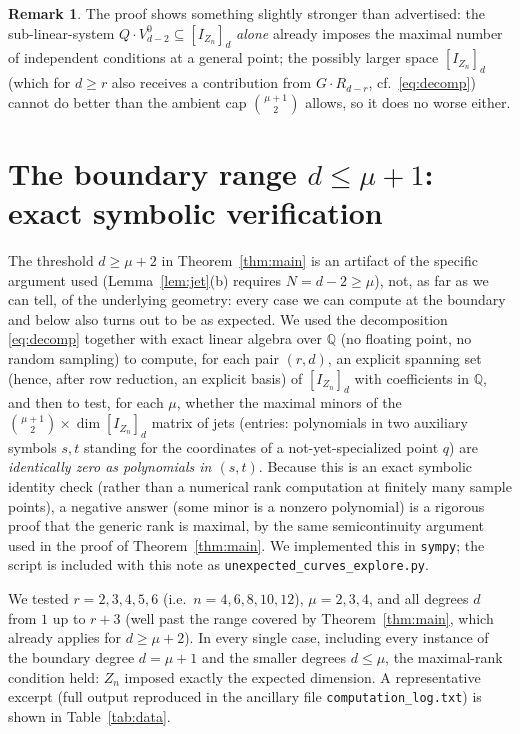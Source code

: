 \documentclass[11pt]{amsart}
\theoremstyle{plain}
\theoremstyle{definition}
\newtheorem{remark}[theorem]{Remark}
\newcommand{\QQ}{\mathbb{Q}}
\begin{document}
\begin{remark}
The proof shows something slightly stronger than advertised: the sub-linear-system $Q\cdot V^0_{d-2}\subseteq [I_{Z_n}]_d$ \emph{alone} already imposes the maximal number of independent conditions at a general point; the possibly larger space $[I_{Z_n}]_d$ (which for $d\ge r$ also receives a contribution from $G\cdot R_{d-r}$, cf.\ \eqref{eq:decomp}) cannot do better than the ambient cap $\binom{\mu+1}2$ allows, so it does no worse either.
\end{remark}

\section{The boundary range $d\le \mu+1$: exact symbolic verification}\label{sec:computation}

The threshold $d\ge\mu+2$ in Theorem~\ref{thm:main} is an artifact of the specific argument used (Lemma~\ref{lem:jet}(b) requires $N=d-2\ge\mu$), not, as far as we can tell, of the underlying geometry: every case we can compute at the boundary and below also turns out to be as expected. We used the decomposition \eqref{eq:decomp} together with exact linear algebra over $\QQ$ (no floating point, no random sampling) to compute, for each pair $(r,d)$, an explicit spanning set (hence, after row reduction, an explicit basis) of $[I_{Z_n}]_d$ with coefficients in $\QQ$, and then to test, for each $\mu$, whether the maximal minors of the $\binom{\mu+1}2\times \dim[I_{Z_n}]_d$ matrix of jets (entries: polynomials in two auxiliary symbols $s,t$ standing for the coordinates of a not-yet-specialized point $q$) are \emph{identically zero as polynomials in $(s,t)$}. Because this is an exact symbolic identity check (rather than a numerical rank computation at finitely many sample points), a negative answer (some minor is a nonzero polynomial) is a rigorous proof that the generic rank is maximal, by the same semicontinuity argument used in the proof of Theorem~\ref{thm:main}. We implemented this in \texttt{sympy}; the script is included with this note as \texttt{unexpected\_curves\_explore.py}.

We tested $r=2,3,4,5,6$ (i.e.\ $n=4,6,8,10,12$), $\mu=2,3,4$, and all degrees $d$ from $1$ up to $r+3$ (well past the range covered by Theorem~\ref{thm:main}, which already applies for $d\ge\mu+2$). In every single case, including every instance of the boundary degree $d=\mu+1$ and the smaller degrees $d\le\mu$, the maximal-rank condition held: $Z_n$ imposed exactly the expected dimension. A representative excerpt (full output reproduced in the ancillary file \texttt{computation\_log.txt}) is shown in Table~\ref{tab:data}.
\end{document}

